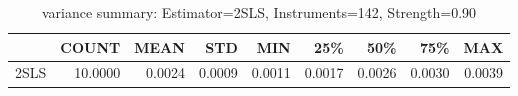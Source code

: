 \begin{table}[ht]
\centering
\caption{variance summary: Estimator=2SLS, Instruments=142, Strength=0.90}
\begin{tabular}{lrrrrrrrr}
\toprule
 & COUNT & MEAN & STD & MIN & 25\% & 50\% & 75\% & MAX \\
\midrule
2SLS & 10.0000 & 0.0024 & 0.0009 & 0.0011 & 0.0017 & 0.0026 & 0.0030 & 0.0039 \\
\bottomrule
\end{tabular}
\end{table}

